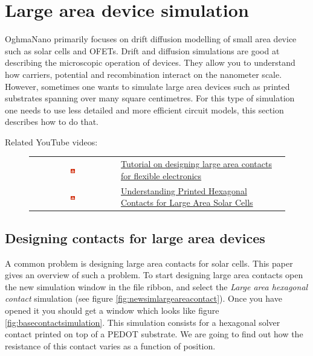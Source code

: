 \chapter{Large area device simulation}
\label{ref:la}
OghmaNano primarily focuses on drift diffusion modelling of small area device such as solar cells and OFETs. Drift and diffusion simulations are good at describing the microscopic operation of devices. They allow you to understand how carriers, potential and recombination interact on the nanometer scale.  However, sometimes one wants to simulate large area devices such as printed substrates spanning over many square centimetres.  For this type of simulation one needs to use less detailed and more efficient circuit models, this section describes how to do that.

Related YouTube videos:
\begin{figure}[H]

\begin{tabular}{ c l }

\includegraphics[width=0.05\textwidth]{./images/youtube.png}

&
\href{https://www.youtube.com/watch?v=XpGr9C_gr7E}{Tutorial on designing large area contacts for flexible electronics}\
\\
\includegraphics[width=0.05\textwidth]{./images/youtube.png}

&
\href{https://www.youtube.com/watch?v=ObBJIE9TmYo}{Understanding Printed Hexagonal Contacts for Large Area Solar Cells}

\end{tabular}
\end{figure}



\section{Designing contacts for large area devices}
A common problem is designing large area contacts for solar cells.  This paper \cite{solak2021understanding} gives an overview of such a problem.   To start designing large area contacts open the new simulation window in the file ribbon, and select the \emph{Large area hexagonal contact} simulation (see figure \ref{fig:newsimlargeareacontact}).  Once you have opened it you should get a window which looks like figure \ref{fig:basecontactsimulation}.  This simulation consists for a hexagonal solver contact printed on top of a PEDOT substrate.  We are going to find out how the resistance of this contact varies as a function of position.




